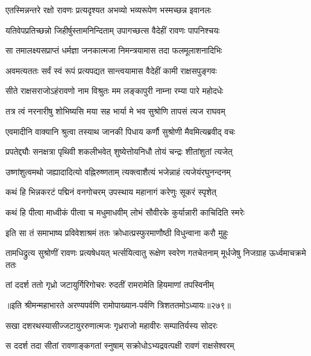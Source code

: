 \twolineshloka
{एतस्मिन्नन्तरे रक्षो रावणः प्रत्यदृश्यत}
{अभव्यो भव्यरूपेण भस्मच्छन्न इवानलः}


\twolineshloka
{यतिवेपप्रतिच्छन्नो जिहीर्षुस्तामनिन्दिताम्}
{उपागच्छत्स वैदेहीं रावणः पापनिश्चयः}


\twolineshloka
{सा तमालक्ष्यसप्राप्तं धर्मज्ञा जनकात्मजा}
{निमन्त्रयामास तदा फलमूलाशनादिभिः}


\twolineshloka
{अवमत्यततः सर्वं स्वं रूपं प्रत्यपद्यत}
{सान्त्वयामास वैदेहीं कामी राक्षसपुङ्गवः}


\twolineshloka
{सीते राक्षसराजोऽहंरावणो नाम विश्रुतः}
{मम लङ्कापुरी नाम्ना रम्या पारे महोदधेः}


\twolineshloka
{तत्र त्वं नरनारीषु शोभिष्यसि मया सह}
{भार्या मे भव सुश्रोणि तापसं त्यज राघवम्}


\twolineshloka
{एवमादीनि वाक्यानि श्रुत्वा तस्याथ जानकी}
{पिधाय कर्णौ सुश्रोणी मैवमित्यब्रवीद् वचः}


\twolineshloka
{प्रपतेद्द्यौः सनक्षत्रा पृथिवी शकलीभवेत्}
{शुष्येत्तोयनिधौ तोयं चन्द्रः शीतांशुतां त्यजेत्}


\twolineshloka
{उष्णांशुत्वमथो जह्यादादित्यो वह्निरुष्णताम्}
{त्यक्त्वाशैत्यं भजेन्नाहं त्यजेयंरघुनन्दनम्}


\twolineshloka
{कथं हि भिन्नकरटं पद्मिनं वनगोचरम्}
{उपस्थाय महानागं करेणुः सूकरं स्पृशेत्}


\twolineshloka
{कथं हि पीत्वा माध्वीकं पीत्वा च मधुमाधवीम्}
{लोभं सौवीरके कुर्यान्नारी काचिदिति स्मरेः}


\twolineshloka
{इति सा तं समाभाष्य प्रविवेशाश्रमं ततः}
{क्रोधात्प्रस्फुरमाणौष्ठी विधुन्वाना करौ मुहुः}


तामधिद्रुत्य सुश्रोणीं रावणः प्रत्यषेधयत्
\twolineshloka
{भर्त्सयित्वातु रूक्षेण स्वरेण गतचेतनाम्}
{मूर्धजेषु निजग्राह ऊर्ध्वमाचक्रमे ततः}


\twolineshloka
{तां ददर्श ततो गृध्रो जटायुर्गिरिगोचरः}
{रुदतीं रामरामेति हियमाणां तपस्विनीम्}


॥इति श्रीमन्महाभारते अरण्यपर्वणि रामोपाख्यान-पर्वणि त्रिशततमोऽध्यायः॥२७९॥

\storymeta

\resetShloka



\twolineshloka
{सखा दशरथस्यासीज्जटायुररुणात्मजः}
{गृध्रराजो महावीरः सम्पातिर्यस्य सोदरः}


\twolineshloka
{स ददर्श तदा सीतां रावणाङ्कगतां स्नुषाम्}
{सक्रोधोऽभ्यद्रवत्पक्षी रावणं राक्षसेश्वरम्}


